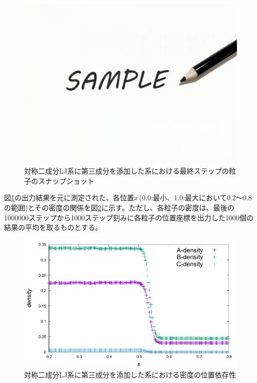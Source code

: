 \documentclass[titlepage]{jsreport}
\begin{document}
\begin{figure}[htbp]
    \begin{center}
        \includegraphics[width=14cm]{fig/sample.jpeg}
    \end{center}
    \caption{対称二成分LJ系に第三成分を添加した系における最終ステップの粒子のスナップショット}
    \label{fig:bi-component-addition-of-3rd-component-highest-purity-sample}
\end{figure}

図\ref{fig:bi-component-addition-of-3rd-component-highest-purity-sample}の出力結果を元に測定された、各位置$x$\,(0.0:最小、1.0:最大において0.2〜0.8の範囲)とその密度の関係を図\ref{fig:lan278176-lbn417263-lcn7025-ran7782-rbn11673-rcn197}に示す。ただし、各粒子の密度は、最後の1000000ステップから1000ステップ刻みに各粒子の位置座標を出力した1000個の結果の平均を取るものとする。

\begin{figure}[htbp]
    \begin{center}
        \includegraphics[width=14cm]{fig/lan278176-lbn417263-lcn7025-ran7782-rbn11673-rcn197/lan278176-lbn417263-lcn7025-ran7782-rbn11673-rcn197.pdf}
    \end{center}
    \caption{対称二成分LJ系に第三成分を添加した系における密度の位置依存性}
    \label{fig:lan278176-lbn417263-lcn7025-ran7782-rbn11673-rcn197}
\end{figure}
\end{document}
